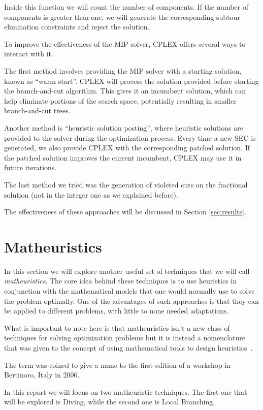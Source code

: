 \documentclass{article}
\begin{document}
Inside this function we will count the number of components. If the number of
components is greater than one, we will generate the corresponding subtour
elimination constraints and reject the solution.

To improve the effectiveness of the MIP solver, CPLEX offers several
ways to interact with it.

The first method involves providing the MIP solver with a starting solution, known as ``warm start''.
CPLEX will process the solution provided before starting the branch-and-cut algorithm.
This gives it an incumbent solution, which can help eliminate portions
of the search space, potentially resulting in smaller branch-and-cut trees.

Another method is ``heuristic solution posting'', where heuristic solutions are provided to the solver
during the optimization process. Every time a new SEC is generated, we also provide CPLEX with
the corresponding patched solution. If the patched solution improves the current incumbent, CPLEX
may use it in future iterations.

The last method we tried was the generation of violeted cuts on the fractional solution
(not in the integer one as we explained before).

The effectiveness of these approaches will be discussed in Section \ref{sec:results}.
\newpage

\section{Matheuristics}
In this section we will explore another useful set of techniques that we will call
\textit{matheuristics}.
The core idea behind these techniques is to use heuristics in conjunction with the
mathematical models that one would normally use to solve the problem optimally.
One of the advantages of such approaches is that they can be applied to different problems,
with little to none needed adaptations.

What is important to note here is that matheuristics isn't a new class of techniques
for solving optimization problems but it is instead a nomenclature that was given
to the concept of using mathematical tools to design heuristics~\cite{boschetti2022matheuristics}.

The term was coined to give a name to the first edition of a workshop in Bertinoro, Italy
in 2006.

In this report we will focus on two matheuristic techniques.
The first one that will be explored is Diving, while the second one is Local Branching.
\end{document}
